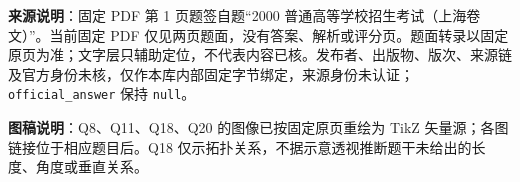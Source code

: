 

\begin{gktip}
\textbf{来源说明}：固定 PDF 第 1 页题签自题“2000 普通高等学校招生考试（上海卷文）”。当前固定 PDF 仅见两页题面，没有答案、解析或评分页。题面转录以固定原页为准；文字层只辅助定位，不代表内容已核。发布者、出版物、版次、来源链及官方身份未核，仅作本库内部固定字节绑定，来源身份未认证；\texttt{official_answer} 保持 \texttt{null}。

\textbf{图稿说明}：Q8、Q11、Q18、Q20 的图像已按固定原页重绘为 TikZ 矢量源；各图链接位于相应题目后。Q18 仅示拓扑关系，不据示意透视推断题干未给出的长度、角度或垂直关系。
\end{gktip}


